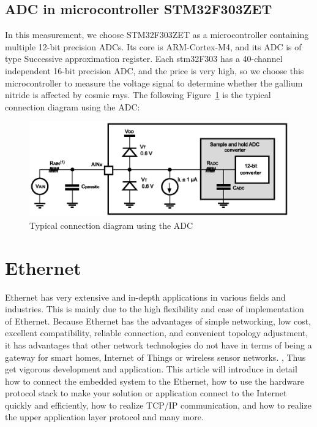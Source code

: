 \subsection{ADC in microcontroller STM32F303ZET}
\label{sec:ADC in microcontroller STM32F303ZET}
In this measurement, we choose STM32F303ZET as a microcontroller containing multiple 12-bit precision ADCs. Its core is ARM-Cortex-M4, and its ADC is of type Successive approximation register.
Each stm32F303 has a 40-channel independent 16-bit precision ADC, and the price is very high, so we choose this microcontroller to measure the voltage signal to determine whether the gallium nitride is affected by cosmic rays. The following Figure~\ref{fig:2.5} is the typical connection diagram using the ADC:
\begin{figure}[h]
	\centering
	\includegraphics{grafiken/2.5.eps}
	\caption{Typical connection diagram using the ADC} 
	\label{fig:2.5}
\end{figure}
\section{Ethernet}
\label{sec:Ethernet}
Ethernet has very extensive and in-depth applications in various fields and industries. This is mainly due to the high flexibility and ease of implementation of Ethernet. Because Ethernet has the advantages of simple networking, low cost, excellent compatibility, reliable connection, and convenient topology adjustment, it has advantages that other network technologies do not have in terms of being a gateway for smart homes, Internet of Things or wireless sensor networks. , Thus get vigorous development and application. This article will introduce in detail how to connect the embedded system to the Ethernet, how to use the hardware protocol stack to make your solution or application connect to the Internet quickly and efficiently, how to realize TCP/IP communication, and how to realize the upper application layer protocol and many more.
